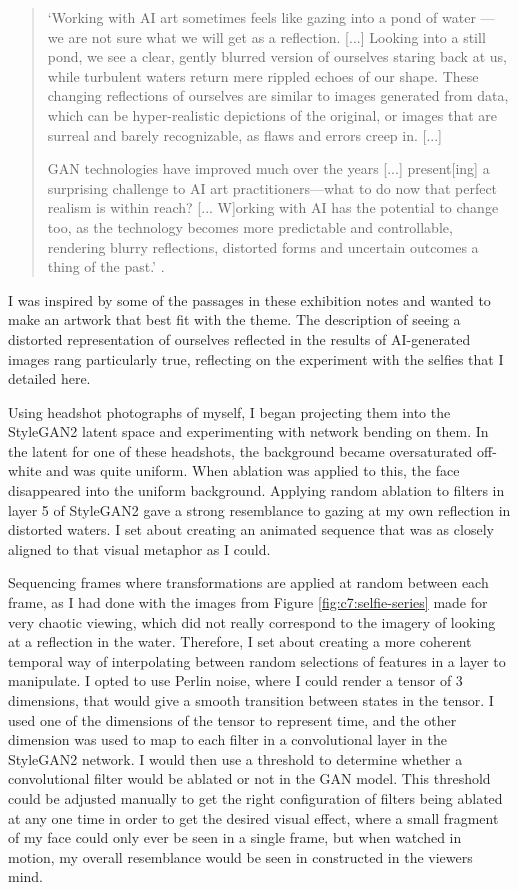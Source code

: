 \begin{quote}
`Working with AI art sometimes feels like gazing into a pond of water — we are not sure what we will get as a reflection. [...] Looking into a still pond, we see a clear, gently blurred version of ourselves staring back at us, while turbulent waters return mere rippled echoes of our shape. These changing reflections of ourselves are similar to images generated from data, which can be hyper-realistic depictions of the original, or images that are surreal and barely recognizable, as flaws and errors creep in. [...]

GAN technologies have improved much over the years [...] present[ing] a surprising challenge to AI art practitioners—what to do now that perfect realism is within reach? [... W]orking with AI has the potential to change too, as the technology becomes more predictable and controllable, rendering blurry reflections, distorted forms and uncertain outcomes a thing of the past.' \citep{elliot2021reflections}.
\end{quote}

I was inspired by some of the passages in these exhibition notes and wanted to make an artwork that best fit with the theme. 
The description of seeing a distorted representation of ourselves reflected in the results of AI-generated images rang particularly true, reflecting on the experiment with the selfies that I detailed here.

Using headshot photographs of myself, I began projecting them into the StyleGAN2 latent space and experimenting with network bending on them. 
In the latent for one of these headshots, the background became oversaturated off-white and was quite uniform. 
When ablation was applied to this, the face disappeared into the uniform background. 
Applying random ablation to filters in layer 5 of StyleGAN2 gave a strong resemblance to gazing at my own reflection in distorted waters.
I set about creating an animated sequence that was as closely aligned to that visual metaphor as I could.

Sequencing frames where transformations are applied at random between each frame, as I had done with the images from Figure \ref{fig:c7:selfie-series} made for very chaotic viewing, which did not really correspond to the imagery of looking at a reflection in the water.
Therefore, I set about creating a more coherent temporal way of interpolating between random selections of features in a layer to manipulate. 
I opted to use Perlin noise, where I could render a tensor of 3 dimensions, that would give a smooth transition between states in the tensor.
I used one of the dimensions of the tensor to represent time, and the other dimension was used to map to each filter in a convolutional layer in the StyleGAN2 network.
I would then use a threshold to determine whether a convolutional filter would be ablated or not in the GAN model.
This threshold could be adjusted manually to get the right configuration of filters being ablated at any one time in order to get the desired visual effect, where a small fragment of my face could only ever be seen in a single frame, but when watched in motion, my overall resemblance would be seen in constructed in the viewers mind. 

